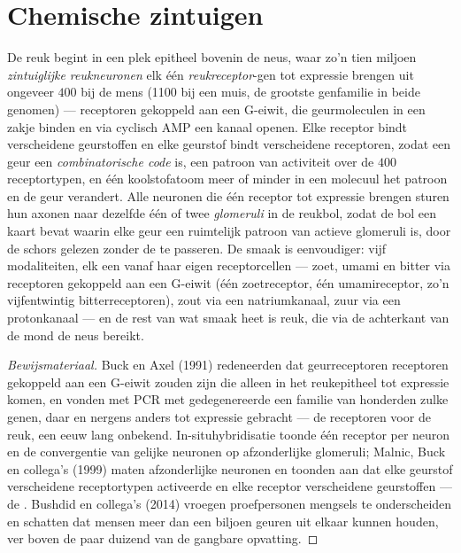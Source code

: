 \section{Chemische zintuigen}

\begin{definition}\label{def:b3:sensory-systems:chemical}
De reuk begint in een plek epitheel bovenin de neus, waar zo'n tien
miljoen \emph{zintuiglijke reukneuronen} elk één \emph{reukreceptor}-gen
tot expressie brengen uit ongeveer $400$ bij de mens (\num{1100} bij
een muis, de grootste genfamilie in beide genomen) --- receptoren
gekoppeld aan een G-eiwit, die geurmoleculen in een zakje binden en via
cyclisch AMP een kanaal openen. Elke receptor bindt verscheidene
geurstoffen en elke geurstof bindt verscheidene receptoren, zodat een
geur een \emph{combinatorische code} is, een patroon van activiteit
over de $400$ receptortypen, en één koolstofatoom meer of minder in een
molecuul het patroon en de geur verandert. Alle neuronen die één
receptor tot expressie brengen sturen hun axonen naar dezelfde één of
twee \emph{glomeruli} in de reukbol, zodat de bol een kaart bevat
waarin elke geur een ruimtelijk patroon van actieve glomeruli is, door
de schors gelezen zonder de  te passeren. De smaak is
eenvoudiger: vijf modaliteiten, elk een  vanaf haar eigen
receptorcellen --- zoet, umami en bitter via receptoren gekoppeld aan
een G-eiwit (één zoetreceptor, één umamireceptor, zo'n vijfentwintig
bitterreceptoren), zout via een natriumkanaal, zuur via een
protonkanaal --- en de rest van wat smaak heet is reuk, die via de
achterkant van de mond de neus bereikt.
\end{definition}

\begin{proof}[Bewijsmateriaal]
Buck en Axel (1991) redeneerden dat geurreceptoren receptoren gekoppeld
aan een G-eiwit zouden zijn die alleen in het reukepitheel tot
expressie komen, en vonden met PCR met gedegenereerde  een
familie van honderden zulke genen, daar en nergens anders tot expressie
gebracht --- de receptoren voor de reuk, een eeuw lang onbekend.
In-situhybridisatie toonde één receptor per neuron en de convergentie
van gelijke neuronen op afzonderlijke glomeruli; Malnic, Buck en
collega's (1999) maten afzonderlijke neuronen en toonden aan dat elke
geurstof verscheidene receptortypen activeerde en elke receptor
verscheidene geurstoffen --- de . Bushdid en
collega's (2014) vroegen proefpersonen mengsels te onderscheiden en
schatten dat mensen meer dan een biljoen geuren uit elkaar kunnen
houden, ver boven de paar duizend van de gangbare opvatting.
\end{proof}

